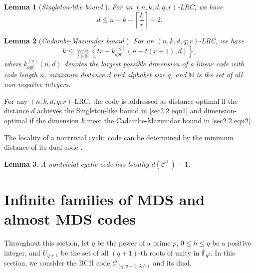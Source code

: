 \documentclass[10pt]{article}%
\newtheorem{lemma}{Lemma}
\begin{document}
	\begin{lemma}[\textit{Singleton-like bound} \cite{Gopalan2012LocalityCodewordSymbols}]
		\label{sec2 lem1}
		For an $(n, k, d, q; r)$-LRC, we have
		\begin{equation}\label{sec2.2 equ1}
			d\leq n-k-\left\lceil\frac{k}{r}\right\rceil+2.
		\end{equation}
	\end{lemma}
	
	\begin{lemma}[\textit{Cadambe-Mazumdar bound} \cite{Cadambe2015BoundsSizeLocally}]
		\label{sec2 lem2}
		For an $(n, k, d, q; r)$-LRC, we have 
		\begin{equation}\label{sec2.2 equ2}
			k\le\min_{t\in\mathbb{N}}\left\{tr+k_{opt}^{(q)}(n-t(r+1),d)\right\},
		\end{equation}
		where $k_{opt}^{(q)}(n,d)$ denotes the largest possible dimension of a linear code with code length $n$, minimum distance $d$ and alphabet size $q$, and $\mathbb{N}$ is the set of all non-negative integers.
	\end{lemma}
	
	For any $(n, k, d, q; r)$-LRC, the code is addressed as distance-optimal if the distance $d$ achieves the Singleton-like bound in \cref{sec2.2 equ1} and dimension-optimal if the dimension $k$ meet the Cadambe-Mazumdar bound in \cref{sec2.2 equ2}.
	
	The locality of a nontrivial cyclic code can be determined by the minimum distance of its dual code \cite{Tan2023MinimumLocalityLinear}.
	\begin{lemma}
		\label{sec2 lem3}
		A nontrivial cyclic code has locality $d(\mathcal{C}^\perp)-1$.
	\end{lemma}
	
	\section{Infinite families of MDS and almost MDS codes}\label{sec3}
	Throughout this section, let $q$ be the power of a prime $p$, $0\le h\le q$ be a positive integer, and $U_{q+1}$ be the set of all $(q+1)$-th roots of unity in $\mathbb{F}_{q^2}$. In this section, we consider the BCH code $\mathcal{C}_{(q,q+1,3,h)}$ and its dual. 
	
\end{document}
